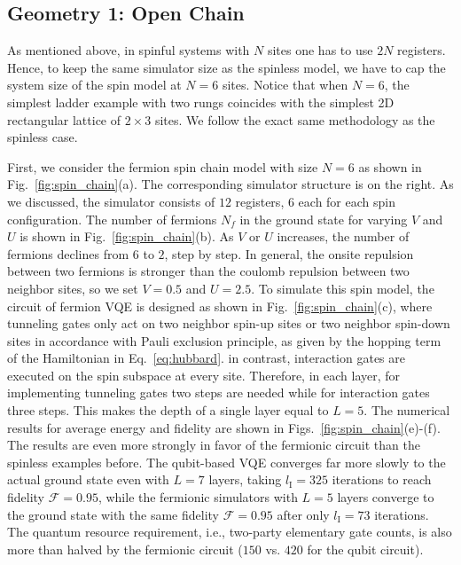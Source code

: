 \documentclass[aps, prx, reprint, superscriptaddress]{revtex4-2}
\begin{document}
\subsection{Geometry 1: Open Chain}
\label{subsec:spinful_open}
As mentioned above, in spinful systems with $N$ sites one has to use $2N$  registers.  
Hence, to keep the same simulator size as the spinless model, we have to cap the system size of the spin model at $N{=}6$ sites. Notice that when $N{=}6$, the simplest ladder example with two rungs coincides with the simplest 2D rectangular lattice of $2 {\times} 3 $ sites. We follow the exact same methodology as the spinless case. 


First, we consider the fermion spin chain model with size $N{=}6$ as shown in Fig.~\ref{fig:spin_chain}(a). The corresponding simulator structure is on the right. As we discussed, the simulator consists of $12$ registers, $6$ each for each spin configuration.  The number of fermions $N_f$ in the ground state for varying $V$ and $U$ is shown in Fig.~\ref{fig:spin_chain}(b). As $V$ or $U$ increases, the number of fermions declines from $6$ to $2$, step by step. In general, the onsite repulsion between two fermions is stronger than the coulomb repulsion between two neighbor sites, so we set $V{=}0.5$ and $U{=}2.5$. To simulate this spin model, the circuit of fermion VQE is designed as shown in Fig.~\ref{fig:spin_chain}(c), where tunneling gates only act on two neighbor spin-up sites or two neighbor spin-down sites in accordance with Pauli exclusion principle, as given by the hopping term of the Hamiltonian in Eq.~\eqref{eq:hubbard}.  in contrast, interaction gates are executed on the spin subspace at every site. Therefore, 
in each layer, for implementing tunneling gates two steps are needed while for interaction gates three steps. This makes the depth of a single layer equal to $L{=}5$. 
The numerical results for average energy and fidelity are shown in Figs.~\ref{fig:spin_chain}(e)-(f). The results are even more strongly in favor of the fermionic circuit than the spinless examples before. The qubit-based VQE converges far more slowly to the actual ground state even with $L{=}7$ layers, taking $l_\text{I}{=}325$ iterations to reach fidelity $\mathcal{F}{=}0.95$, while the fermionic simulators with $L{=}5$ layers converge to the ground state with the same fidelity $\mathcal{F}{=}0.95$ after only $l_\text{I}{=}73$ iterations. The quantum resource requirement, i.e., two-party elementary gate counts, is also more than halved by the fermionic circuit ($150$ vs. $420$ for the qubit circuit). 
\end{document}
